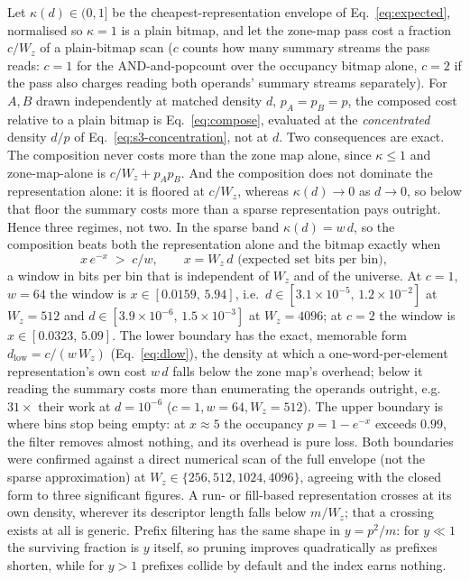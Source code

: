 Let $\kappa(d)\in(0,1]$ be the cheapest-representation envelope of Eq.~\eqref{eq:expected}, normalised
so $\kappa=1$ is a plain bitmap, and let the zone-map pass cost a fraction $c/W_z$ of a plain-bitmap
scan ($c$ counts how many summary streams the pass reads: $c=1$ for the AND-and-popcount over the
occupancy bitmap alone, $c=2$ if the pass also charges reading both operands' summary streams
separately). For $A,B$ drawn independently at matched density $d$, $p_A=p_B=p$, the composed cost
relative to a plain bitmap is Eq.~\eqref{eq:compose}, evaluated at the \emph{concentrated} density
$d/p$ of Eq.~\eqref{eq:s3-concentration}, not at $d$. Two consequences are exact. The composition never
costs more than the zone map alone, since $\kappa\le1$ and zone-map-alone is $c/W_z+p_Ap_B$. And the
composition does not dominate the representation alone: it is floored at $c/W_z$, whereas
$\kappa(d)\to0$ as $d\to0$, so below that floor the summary costs more than a sparse representation
pays outright. Hence three regimes, not two. In the sparse band $\kappa(d)=w\,d$, so the
composition beats both the representation alone and the bitmap exactly when
\begin{equation}
x\,e^{-x} \;>\; c/w, \qquad x=W_z\,d \text{ (expected set bits per bin)},
\label{eq:s3-window}
\end{equation}
a window in bits per bin that is independent of $W_z$ and of the universe. At $c=1$, $w=64$ the window
is $x\in[0.0159,\,5.94]$, i.e.\ $d\in[3.1\times10^{-5},\,1.2\times10^{-2}]$ at $W_z=512$ and
$d\in[3.9\times10^{-6},\,1.5\times10^{-3}]$ at $W_z=4096$; at $c=2$ the window is
$x\in[0.0323,\,5.09]$. The lower boundary has the exact, memorable form $d_{\mathrm{low}}=c/(w\,W_z)$
(Eq.~\eqref{eq:dlow}), the density at which a one-word-per-element representation's own cost $w\,d$
falls below the zone map's overhead; below it reading the summary costs more than enumerating the
operands outright, e.g.\ $31\times$ their work at $d=10^{-6}$ ($c=1,w=64,W_z=512$). The upper boundary
is where bins stop being empty: at $x\approx5$ the occupancy $p=1-e^{-x}$ exceeds $0.99$, the filter
removes almost nothing, and its overhead is pure loss. Both boundaries were confirmed against a direct
numerical scan of the full envelope (not the sparse approximation) at $W_z\in\{256,512,1024,4096\}$,
agreeing with the closed form to three significant figures. A run- or fill-based representation crosses
at its own density, wherever its descriptor length falls below $m/W_z$; that a crossing exists at all
is generic. Prefix filtering has the same shape in $y=p^2/m$: for $y\ll1$ the surviving fraction is $y$
itself, so pruning improves quadratically as prefixes shorten, while for $y>1$ prefixes collide by
default and the index earns nothing.

